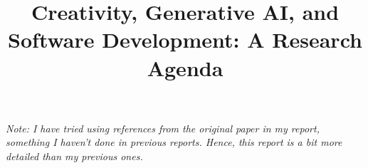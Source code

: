 \documentclass{article}      %
\title{Creativity, Generative AI, and Software Development: A Research Agenda}  %
\begin{document}

\maketitle                   %

\vspace{15pt}
\begin{center}
    \textit{Note: I have tried using references from the original paper in my report, something I haven't done in previous reports. Hence, this report is a bit more detailed than my previous ones.}
\end{center}
\vspace{15pt}



\printbibliography
\end{document}
